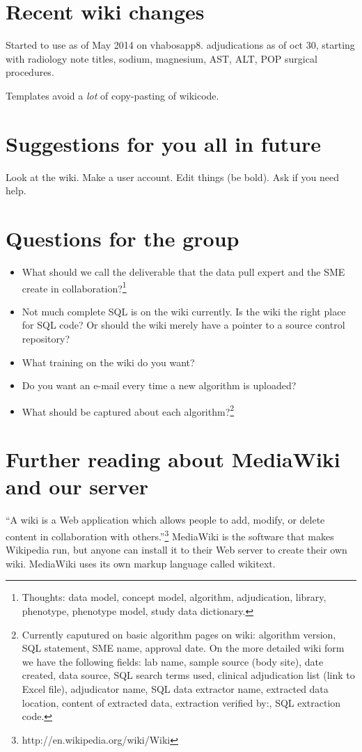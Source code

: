 \documentclass{tufte-handout}
\begin{document}
\section{Recent wiki changes} 

Started to use as of May 2014 on vhabosapp8. adjudications as of oct
30, starting with radiology note titles, sodium, magnesium, AST, ALT,
POP surgical procedures.

Templates avoid a \emph{lot} of copy-pasting of wikicode.

\section{Suggestions for you all in future}

Look at the wiki. Make a user account. Edit things (be bold). Ask if
you need help.

\section{Questions for the group}

\begin{itemize}

\item What should we call the deliverable that the data pull expert
  and the SME create in collaboration?\footnote{Thoughts: data
    model, concept model, algorithm, adjudication, library, phenotype,
    phenotype model, study data dictionary.}

\item Not much complete SQL is on the wiki currently. Is the wiki the
  right place for SQL code? Or should the wiki merely have a pointer
  to a source control repository?

\item What training on the wiki do you want?

\item Do you want an e-mail every time a new algorithm is uploaded?

\item What should be captured about each algorithm?\footnote{Currently
  caputured on basic algorithm pages on wiki: algorithm version, SQL
  statement, SME name, approval date. On the more detailed wiki form
  we have the following fields: lab name, sample source (body site),
  date created, data source, SQL search terms used, clinical
  adjudication list (link to Excel file), adjudicator name, SQL data
  extractor name, extracted data location, content of extracted data,
  extraction verified by:, SQL extraction code.}

\end{itemize}

\section{Further reading about MediaWiki and our server}

``A wiki is a Web application which allows people to add, modify, or
delete content in collaboration with
others.''\footnote{http://en.wikipedia.org/wiki/Wiki} MediaWiki is the
software that makes Wikipedia run, but anyone can install it to their
Web server to create their own wiki. MediaWiki uses its own markup
language called wikitext.
\end{document}
